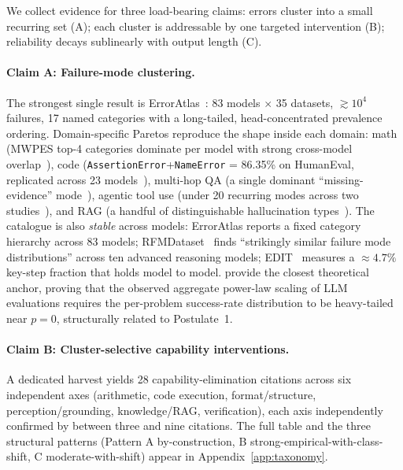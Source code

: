 \documentclass{article}
\theoremstyle{taeplain}
\theoremstyle{taedefn}
\newcommand{\teApprox}{\ensuremath{\approx}}
\begin{document}
We collect evidence for three load-bearing claims: errors cluster into a small recurring set (A); each cluster is addressable by one targeted intervention (B); reliability decays sublinearly with output length (C).

\paragraph{Claim A: Failure-mode clustering.}
The strongest single result is ErrorAtlas~\citep{ashurytahan2026erroratlas}: 83 models $\times$ 35 datasets, $\gtrsim 10^4$ failures, 17 named categories with a long-tailed, head-concentrated prevalence ordering. Domain-specific Paretos reproduce the shape inside each domain: math (MWPES top-4 categories dominate per model with strong cross-model overlap~\citep{sun2025mwpes}), code (\texttt{AssertionError}+\texttt{NameError} = 86.35\% on HumanEval, replicated across 23 models~\citep{wen2024fixing}), multi-hop QA (a single dominant ``missing-evidence'' mode~\citep{zhang2026weakestlink}), agentic tool use (under 20 recurring modes across two studies~\citep{cemri2025mast,yao2024taubench}), and RAG (a handful of distinguishable hallucination types~\citep{wood2024acurai}). The catalogue is also \emph{stable} across models: ErrorAtlas reports a fixed category hierarchy across 83 models; RFMDataset~\citep{guo2025rfmdataset} finds ``strikingly similar failure mode distributions'' across ten advanced reasoning models; EDIT~\citep{dai2025edit} measures a $\teApprox 4.7\%$ key-step fraction that holds model to model. \citet{schaeffer2025monkeys} provide the closest theoretical anchor, proving that the observed aggregate power-law scaling of LLM evaluations requires the per-problem success-rate distribution to be heavy-tailed near $p=0$, structurally related to Postulate~1.

\paragraph{Claim B: Cluster-selective capability interventions.}
A dedicated harvest yields 28 capability-elimination citations across six independent axes (arithmetic, code execution, format/structure, perception/grounding, knowledge/RAG, verification), each axis independently confirmed by between three and nine citations. The full table and the three structural patterns (Pattern A by-construction, B strong-empirical-with-class-shift, C moderate-with-shift) appear in Appendix~\ref{app:taxonomy}.
\end{document}
